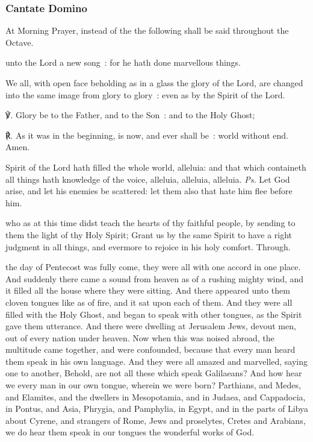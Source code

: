 
\subsubsection{Cantate Domino}\label{cantatedomino}
\begin{rubric}
    At Morning Prayer, instead of the  the following shall be said throughout the Octave.
\end{rubric}

 unto the Lord a new song~: for he hath done marvellous things.



We all, with open face beholding as in a glass the glory of the Lord, are changed into the same image from glory to glory~: even as by the Spirit of the Lord.

℣. Glory be to the Father, and to the Son~: and to the Holy Ghost;\par
℟. As it was in the beginning, is now, and ever shall be~: world without end. Amen.


\introit
{} Spirit of the Lord hath filled the whole world, alleluia: and that which containeth all things hath knowledge of the voice, alleluia, alleluia, alleluia. \textit{Ps.} Let God arise, and let his enemies be scattered: let them also that hate him flee before him.

\collect
{} who as at this time didst teach the hearts of thy faithful people, by sending to them the light of thy Holy Spirit; Grant us by the same Spirit to have a right judgment in all things, and evermore to rejoice in his holy comfort. Through.

 the day of Pentecost was fully come, they were all with one accord in one place. And suddenly there came a sound from heaven as of a rushing mighty wind, and it filled all the house where they were sitting. And there appeared unto them cloven tongues like as of fire, and it sat upon each of them. And they were all filled with the Holy Ghost, and began to speak with other tongues, as the Spirit gave them utterance. And there were dwelling at Jerusalem Jews, devout men, out of every nation under heaven. Now when this was noised abroad, the multitude came together, and were confounded, because that every man heard them speak in his own language. And they were all amazed and marvelled, saying one to another, Behold, are not all these which speak Galilaeans? And how hear we every man in our own tongue, wherein we were born? Parthians, and Medes, and Elamites, and the dwellers in Mesopotamia, and in Judaea, and Cappadocia, in Pontus, and Asia, Phrygia, and Pamphylia, in Egypt, and in the parts of Libya about Cyrene, and strangers of Rome, Jews and proselytes, Cretes and Arabians, we do hear them speak in our tongues the wonderful works of God.


